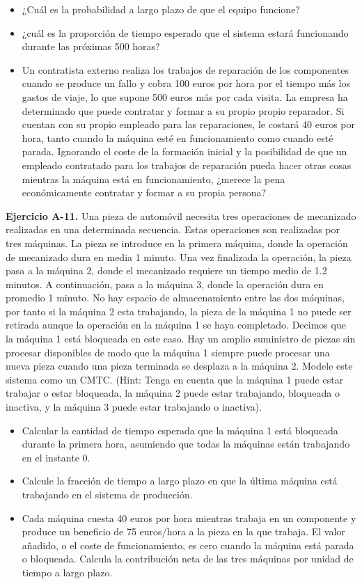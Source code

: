 \documentclass[
]{book}
\providecommand{\tightlist}{%
  \setlength{\itemsep}{0pt}\setlength{\parskip}{0pt}}
\theoremstyle{definition}
\theoremstyle{definition}
\theoremstyle{definition}
\theoremstyle{definition}
\theoremstyle{remark}
\begin{document}
\begin{itemize}
\tightlist
\item
  ¿Cuál es la probabilidad a largo plazo de que el equipo funcione?
\item
  ¿cuál es la proporción de tiempo esperado que el sistema estará funcionando durante las próximas 500 horas?
\item
  Un contratista externo realiza los trabajos de reparación de los componentes cuando se produce un fallo y cobra 100 euros por hora por el tiempo más los gastos de viaje, lo que supone 500 euros más por cada visita. La empresa ha determinado que puede contratar y formar a su propio propio reparador. Si cuentan con su propio empleado para las reparaciones, le costará 40 euros por hora, tanto cuando la máquina esté en funcionamiento como cuando esté parada. Ignorando el coste de la formación inicial y la posibilidad de que un empleado contratado para los trabajos de reparación pueda hacer otras cosas mientras la máquina está en funcionamiento, ¿merece la pena económicamente contratar y formar a su propia persona?
\end{itemize}

\textbf{Ejercicio A-11.} Una pieza de automóvil necesita tres operaciones de mecanizado realizadas en una determinada secuencia. Estas operaciones son realizadas por tres máquinas. La pieza se introduce en la primera máquina, donde la operación de mecanizado dura en media 1 minuto. Una vez finalizada la operación, la pieza pasa a la máquina 2, donde el mecanizado requiere un tiempo medio de 1.2 minutos. A continuación, pasa a la máquina 3, donde la operación dura en promedio 1 minuto. No hay espacio de almacenamiento entre las dos máquinas, por tanto si la máquina 2 esta trabajando, la pieza de la máquina 1 no puede ser retirada aunque la operación en la máquina 1 se haya completado. Decimos que la máquina 1 está bloqueada en este caso. Hay un amplio suministro de piezas sin procesar disponibles de modo que la máquina 1 siempre puede procesar una nueva pieza cuando una pieza terminada se desplaza a la máquina 2. Modele este sistema como un CMTC. (Hint: Tenga en cuenta que la máquina 1 puede estar trabajar o estar bloqueada, la máquina 2 puede estar trabajando, bloqueada o inactiva, y la máquina 3 puede estar trabajando o inactiva).

\begin{itemize}
\tightlist
\item
  Calcular la cantidad de tiempo esperada que la máquina 1 está bloqueada durante la primera hora, asumiendo que todas la máquinas están trabajando en el instante 0.
\item
  Calcule la fracción de tiempo a largo plazo en que la última máquina está trabajando en el sistema de producción.
\item
  Cada máquina cuesta 40 euros por hora mientras trabaja en un componente y produce un beneficio de 75 euros/hora a la pieza en la que trabaja. El valor añadido, o el coste de funcionamiento, es cero cuando la máquina está parada o bloqueada. Calcula la contribución neta de las tres máquinas por unidad de tiempo a largo plazo.
\end{itemize}
\end{document}
